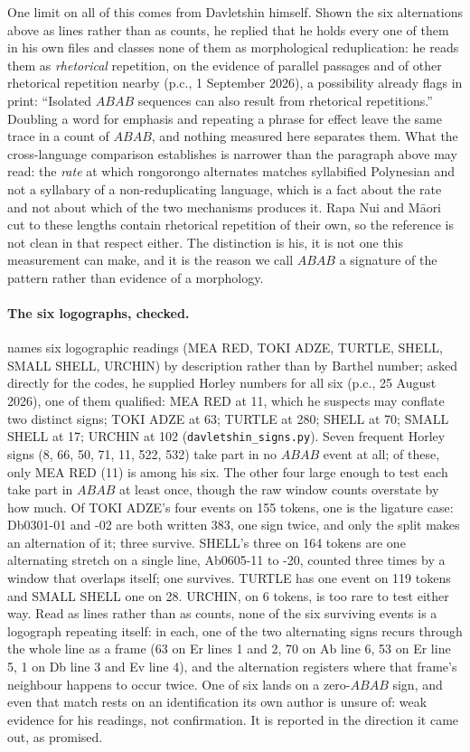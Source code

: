 \documentclass[11pt,a4paper]{article}
\begin{document}
One limit on all of this comes from Davletshin himself. Shown the six alternations above as lines rather than as counts, he replied that he holds every one of them in his own files and classes none of them as morphological reduplication: he reads them as \emph{rhetorical} repetition, on the evidence of parallel passages and of other rhetorical repetition nearby (p.c., 1 September 2026), a possibility \citet{davletshin2022} already flags in print: ``Isolated $ABAB$ sequences can also result from rhetorical repetitions.'' Doubling a word for emphasis and repeating a phrase for effect leave the same trace in a count of $ABAB$, and nothing measured here separates them. What the cross-language comparison establishes is narrower than the paragraph above may read: the \emph{rate} at which rongorongo alternates matches syllabified Polynesian and not a syllabary of a non-reduplicating language, which is a fact about the rate and not about which of the two mechanisms produces it. Rapa Nui and M\=aori cut to these lengths contain rhetorical repetition of their own, so the reference is not clean in that respect either. The distinction is his, it is not one this measurement can make, and it is the reason we call $ABAB$ a signature of the pattern rather than evidence of a morphology.

\paragraph{The six logographs, checked.} \citet{davletshin2022} names six logographic readings (MEA RED, TOKI ADZE, TURTLE, SHELL, SMALL SHELL, URCHIN) by description rather than by Barthel number; asked directly for the codes, he supplied Horley numbers for all six (p.c., 25 August 2026), one of them qualified: MEA RED at 11, which he suspects may conflate two distinct signs; TOKI ADZE at 63; TURTLE at 280; SHELL at 70; SMALL SHELL at 17; URCHIN at 102 (\texttt{davletshin\_signs.py}). Seven frequent Horley signs (8, 66, 50, 71, 11, 522, 532) take part in no $ABAB$ event at all; of these, only MEA RED (11) is among his six. The other four large enough to test each take part in $ABAB$ at least once, though the raw window counts overstate by how much. Of TOKI ADZE's four events on 155 tokens, one is the ligature case: Db0301-01 and -02 are both written 383, one sign twice, and only the split makes an alternation of it; three survive. SHELL's three on 164 tokens are one alternating stretch on a single line, Ab0605-11 to -20, counted three times by a window that overlaps itself; one survives. TURTLE has one event on 119 tokens and SMALL SHELL one on 28. URCHIN, on 6 tokens, is too rare to test either way. Read as lines rather than as counts, none of the six surviving events is a logograph repeating itself: in each, one of the two alternating signs recurs through the whole line as a frame (63 on Er lines 1 and 2, 70 on Ab line 6, 53 on Er line 5, 1 on Db line 3 and Ev line 4), and the alternation registers where that frame's neighbour happens to occur twice. One of six lands on a zero-$ABAB$ sign, and even that match rests on an identification its own author is unsure of: weak evidence for his readings, not confirmation. It is reported in the direction it came out, as promised.
\end{document}
